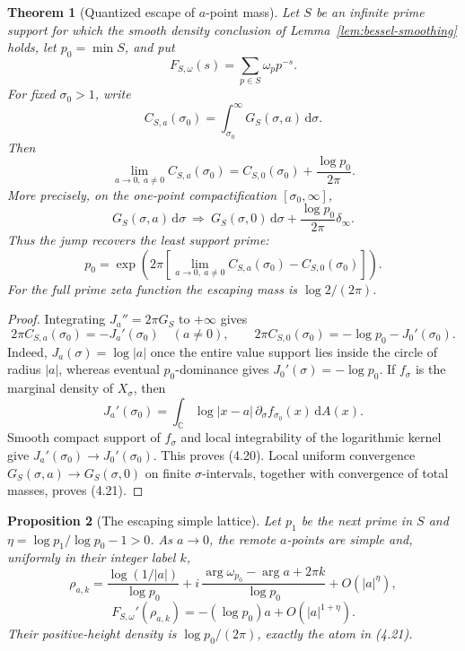 \documentclass[11pt]{article}
\newtheorem{theorem}{Theorem}[section]
\newtheorem{proposition}[theorem]{Proposition}
\theoremstyle{definition}
\theoremstyle{remark}
\newcommand{\dd}{\,\mathrm d}
\newcommand{\C}{\mathbb C}
\begin{document}
\begin{theorem}[Quantized escape of $a$-point mass]
\label{thm:mass-escape}
Let $S$ be an infinite prime support for which the smooth density conclusion of
Lemma~\ref{lem:bessel-smoothing} holds, let $p_0=\min S$, and put
\[
 F_{S,\omega}(s)=\sum_{p\in S}\omega_pp^{-s}.
\]
For fixed $\sigma_0>1$, write
\[
 C_{S,a}(\sigma_0)=\int_{\sigma_0}^{\infty}G_S(\sigma,a)\dd\sigma.
\]
Then
\[
 \boxed{
 \lim_{a\to0,\ a\ne0}C_{S,a}(\sigma_0)
 =C_{S,0}(\sigma_0)+\frac{\log p_0}{2\pi}.
 }
\tag{4.20}
\]
More precisely, on the one-point compactification $[\sigma_0,\infty]$,
\[
 \boxed{
 G_S(\sigma,a)\dd\sigma\ \Longrightarrow\
 G_S(\sigma,0)\dd\sigma+\frac{\log p_0}{2\pi}\delta_\infty .
 }
\tag{4.21}
\]
Thus the jump recovers the least support prime:
\[
 p_0=\exp\!\left(2\pi
  \left[\lim_{a\to0,\ a\ne0}C_{S,a}(\sigma_0)-C_{S,0}(\sigma_0)\right]
 \right).
\tag{4.22}
\]
For the full prime zeta function the escaping mass is $\log2/(2\pi)$.
\end{theorem}

\begin{proof}
Integrating $J_a''=2\pi G_S$ to $+\infty$ gives
\[
 2\pi C_{S,a}(\sigma_0)=-J_a'(\sigma_0)\quad(a\ne0),
 \qquad
 2\pi C_{S,0}(\sigma_0)=-\log p_0-J_0'(\sigma_0).
\]
Indeed, $J_a(\sigma)=\log|a|$ once the entire value support lies inside the circle
of radius $|a|$, whereas eventual $p_0$-dominance gives
$J_0'(\sigma)=-\log p_0$.  If $f_\sigma$ is the marginal density of $X_\sigma$,
then
\[
 J_a'(\sigma_0)=
 \int_\C\log|x-a|\,\partial_\sigma f_{\sigma_0}(x)\dd A(x).
\]
Smooth compact support of $f_\sigma$ and local integrability of the logarithmic kernel
give $J_a'(\sigma_0)\to J_0'(\sigma_0)$.  This proves (4.20).  Local uniform
convergence $G_S(\sigma,a)\to G_S(\sigma,0)$ on finite $\sigma$-intervals, together
with convergence of total masses, proves (4.21).
\end{proof}

\begin{proposition}[The escaping simple lattice]
\label{prop:escape-lattice}
Let $p_1$ be the next prime in $S$ and
$\eta=\log p_1/\log p_0-1>0$.  As $a\to0$, the remote $a$-points are simple and,
uniformly in their integer label $k$,
\[
 \rho_{a,k}=\frac{\log(1/|a|)}{\log p_0}
 +i\,\frac{\arg\omega_{p_0}-\arg a+2\pi k}{\log p_0}
 +O(|a|^\eta),
\tag{4.23}
\]
\[
 F_{S,\omega}'(\rho_{a,k})=-(\log p_0)a+O(|a|^{1+\eta}).
\tag{4.24}
\]
Their positive-height density is $\log p_0/(2\pi)$, exactly the atom in (4.21).
\end{proposition}
\end{document}
